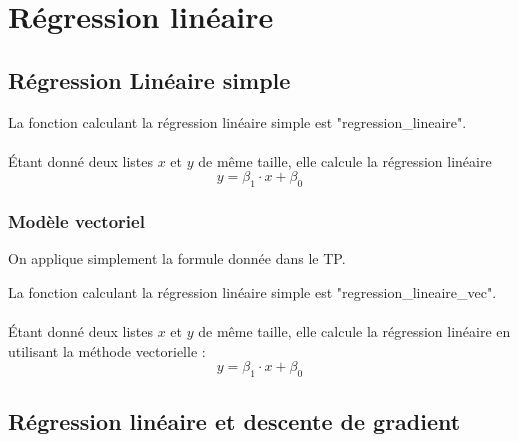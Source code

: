 \documentclass{article}      %
\begin{document}
\section{Régression linéaire}
\subsection{Régression Linéaire simple}
La fonction calculant la régression linéaire simple est "regression\_lineaire".
\\%
\\Étant donné deux listes $x$ et $y$ de même taille, elle calcule la régression linéaire $$y = \beta_1 \cdot x + \beta_0$$
%

\subsubsection{Modèle vectoriel}
On applique simplement la formule donnée dans le TP.

La fonction calculant la régression linéaire simple est "regression\_lineaire\_vec".
\\%
\\Étant donné deux listes $x$ et $y$ de même taille, elle calcule la régression linéaire en utilisant la méthode vectorielle : $$y = \beta_1 \cdot x + \beta_0$$
%

\subsection{Régression linéaire et descente de gradient}
\end{document}
